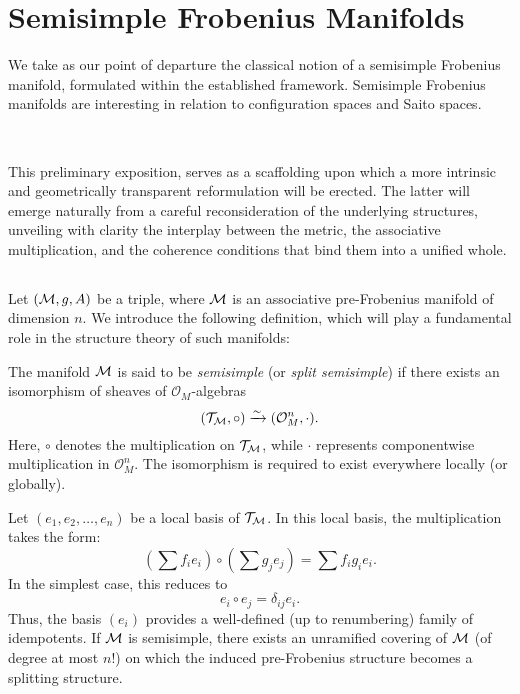 \section{Semisimple Frobenius Manifolds}
We take as our point of departure the classical notion of a semisimple Frobenius manifold, formulated within the established framework. Semisimple Frobenius manifolds are interesting in relation to configuration spaces and Saito spaces. 

\,

This preliminary exposition, serves as a scaffolding upon which a more intrinsic and geometrically transparent reformulation will be erected. The latter will emerge naturally from a careful reconsideration of the underlying structures, unveiling with clarity the interplay between the metric, the associative multiplication, and the coherence conditions that bind them into a unified whole.


\subsection{}
 
Let $(\mathcal{M}, g, A)$ be a triple, where $\mathcal{M}$ is an associative pre-Frobenius manifold of dimension $n$. We introduce the following definition, which will play a fundamental role in the structure theory of such manifolds:

\begin{definition}
The manifold $\mathcal{M}$ is said to be \emph{semisimple} (or \emph{split semisimple}) if there exists an isomorphism of sheaves of $\mathcal{O}_M$-algebras
\[
(\mathcal{T}_{\mathcal{M}}, \circ) \xrightarrow{\sim} (\mathcal{O}_M^n, \cdot).
\]
Here, $\circ$ denotes the multiplication on $\mathcal{T}_{\mathcal{M}}$, while $\cdot$ represents componentwise multiplication in $\mathcal{O}_M^n$. The isomorphism is required to exist everywhere locally (or globally).
\end{definition}

Let $(e_1, e_2, \dots, e_n)$ be a local basis of $\mathcal{T}_{\mathcal{M}}$. In this local basis, the multiplication takes the form:
\[
\left( \sum f_i e_i \right) \circ \left( \sum g_j e_j \right) = \sum f_i g_i e_i.
\]
In the simplest case, this reduces to
\[
e_i \circ e_j = \delta_{ij} e_i.
\]
Thus, the basis $(e_i)$ provides a well-defined (up to renumbering) family of idempotents. If $\mathcal{M}$ is semisimple, there exists an unramified covering of $\mathcal{M}$ (of degree at most $n!$) on which the induced pre-Frobenius structure becomes a splitting structure.

\, 

